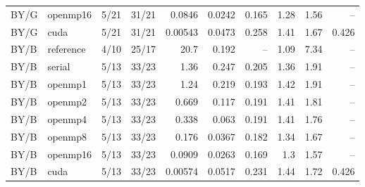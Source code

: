 \documentclass[11pt]{article}
\begin{document}
\begin{longtable}{llrrrrrrrr}
BY/G & openmp16 & 5/21 & 31/21 & 0.0846 & 0.0242 & 0.165 & 1.28 & 1.56 & --\\
BY/G & cuda & 5/21 & 31/21 & 0.00543 & 0.0473 & 0.258 & 1.41 & 1.67 & 0.426\\
BY/B & reference & 4/10 & 25/17 & 20.7 & 0.192 & -- & 1.09 & 7.34 & --\\
BY/B & serial & 5/13 & 33/23 & 1.36 & 0.247 & 0.205 & 1.36 & 1.91 & --\\
BY/B & openmp1 & 5/13 & 33/23 & 1.24 & 0.219 & 0.193 & 1.42 & 1.91 & --\\
BY/B & openmp2 & 5/13 & 33/23 & 0.669 & 0.117 & 0.191 & 1.41 & 1.81 & --\\
BY/B & openmp4 & 5/13 & 33/23 & 0.338 & 0.063 & 0.191 & 1.41 & 1.76 & --\\
BY/B & openmp8 & 5/13 & 33/23 & 0.176 & 0.0367 & 0.182 & 1.34 & 1.67 & --\\
BY/B & openmp16 & 5/13 & 33/23 & 0.0909 & 0.0263 & 0.169 & 1.3 & 1.57 & --\\
BY/B & cuda & 5/13 & 33/23 & 0.00574 & 0.0517 & 0.231 & 1.44 & 1.72 & 0.426\\
\bottomrule\end{longtable}\normalsize
\end{document}
